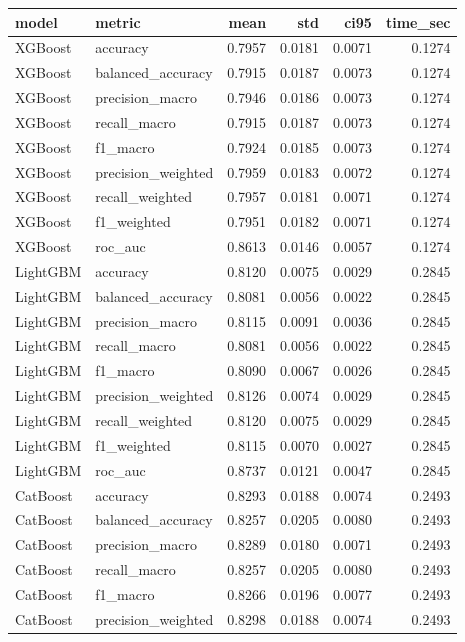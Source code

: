 \begin{tabular}{llrrrr}
\toprule
model & metric & mean & std & ci95 & time_sec \\
\midrule
XGBoost & accuracy & 0.7957 & 0.0181 & 0.0071 & 0.1274 \\
XGBoost & balanced_accuracy & 0.7915 & 0.0187 & 0.0073 & 0.1274 \\
XGBoost & precision_macro & 0.7946 & 0.0186 & 0.0073 & 0.1274 \\
XGBoost & recall_macro & 0.7915 & 0.0187 & 0.0073 & 0.1274 \\
XGBoost & f1_macro & 0.7924 & 0.0185 & 0.0073 & 0.1274 \\
XGBoost & precision_weighted & 0.7959 & 0.0183 & 0.0072 & 0.1274 \\
XGBoost & recall_weighted & 0.7957 & 0.0181 & 0.0071 & 0.1274 \\
XGBoost & f1_weighted & 0.7951 & 0.0182 & 0.0071 & 0.1274 \\
XGBoost & roc_auc & 0.8613 & 0.0146 & 0.0057 & 0.1274 \\
LightGBM & accuracy & 0.8120 & 0.0075 & 0.0029 & 0.2845 \\
LightGBM & balanced_accuracy & 0.8081 & 0.0056 & 0.0022 & 0.2845 \\
LightGBM & precision_macro & 0.8115 & 0.0091 & 0.0036 & 0.2845 \\
LightGBM & recall_macro & 0.8081 & 0.0056 & 0.0022 & 0.2845 \\
LightGBM & f1_macro & 0.8090 & 0.0067 & 0.0026 & 0.2845 \\
LightGBM & precision_weighted & 0.8126 & 0.0074 & 0.0029 & 0.2845 \\
LightGBM & recall_weighted & 0.8120 & 0.0075 & 0.0029 & 0.2845 \\
LightGBM & f1_weighted & 0.8115 & 0.0070 & 0.0027 & 0.2845 \\
LightGBM & roc_auc & 0.8737 & 0.0121 & 0.0047 & 0.2845 \\
CatBoost & accuracy & 0.8293 & 0.0188 & 0.0074 & 0.2493 \\
CatBoost & balanced_accuracy & 0.8257 & 0.0205 & 0.0080 & 0.2493 \\
CatBoost & precision_macro & 0.8289 & 0.0180 & 0.0071 & 0.2493 \\
CatBoost & recall_macro & 0.8257 & 0.0205 & 0.0080 & 0.2493 \\
CatBoost & f1_macro & 0.8266 & 0.0196 & 0.0077 & 0.2493 \\
CatBoost & precision_weighted & 0.8298 & 0.0188 & 0.0074 & 0.2493 \\

\end{tabular}
